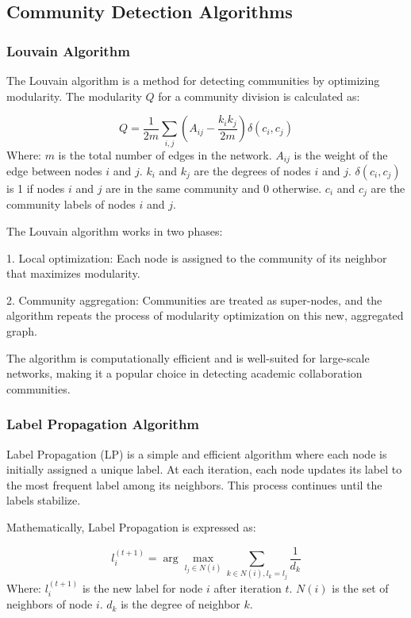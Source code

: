 \documentclass[11pt]{article}
\begin{document}
\subsection{Community Detection Algorithms}

\subsubsection{Louvain Algorithm}
The Louvain algorithm is a method for detecting communities by optimizing modularity.
The modularity \( Q \) for a community division is calculated as:

\[
	Q = \frac{1}{2m} \sum_{i,j} \left( A_{ij} - \frac{k_i k_j}{2m} \right) \delta(c_i, c_j)
\]
Where:
\( m \) is the total number of edges in the network.
\( A_{ij} \) is the weight of the edge between nodes \( i \) and \( j \).
\( k_i \) and \( k_j \) are the degrees of nodes \( i \) and \( j \).
\( \delta(c_i, c_j) \) is 1 if nodes \( i \) and \( j \) are in the same community and 0 otherwise.
\( c_i \) and \( c_j \) are the community labels of nodes \( i \) and \( j \).

The Louvain algorithm works in two phases:

1. Local optimization: Each node is assigned to the community of its neighbor that maximizes modularity.

2. Community aggregation: Communities are treated as super-nodes, and the algorithm repeats the process of modularity optimization on this new, aggregated graph.

The algorithm is computationally efficient and is well-suited for large-scale networks, making it a popular choice in detecting academic collaboration communities.

\subsubsection{Label Propagation Algorithm}
Label Propagation (LP) is a simple and efficient algorithm where each node is initially assigned a unique label. At each iteration, each node updates its label to the most frequent label among its neighbors. This process continues until the labels stabilize.

Mathematically, Label Propagation is expressed as:

\[
	l_i^{(t+1)} = \arg\max_{l_j \in N(i)} \sum_{k \in N(i), l_k = l_j} \frac{1}{d_k}
\]
Where:
\( l_i^{(t+1)} \) is the new label for node
\( i \) after iteration \( t \). \( N(i) \) is the set of neighbors of node \( i \).
\( d_k \) is the degree of neighbor \( k \).
\end{document}
